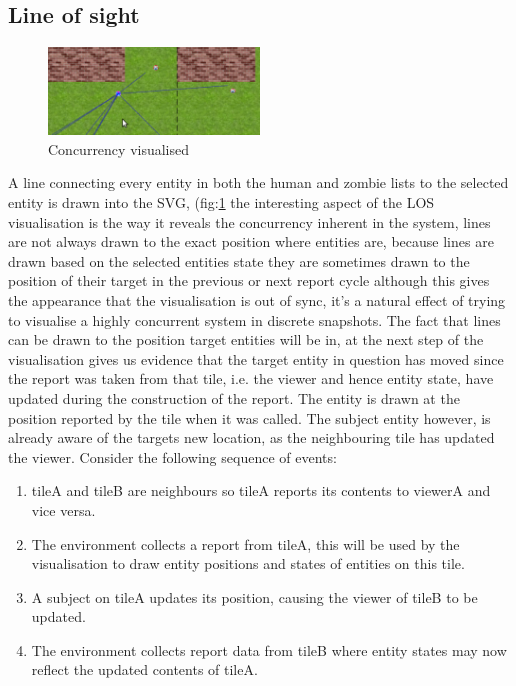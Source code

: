 \subsection{Line of sight}
\begin{figure}[h]
  \centering
  \includegraphics[width=0.5\textwidth]{img/concurrent-lag.png}
\caption{Concurrency visualised}
    \label{fig:Concurrency visualised}
\end{figure}
A line connecting every entity in both the human and zombie lists to the selected entity is drawn into the SVG, (fig:\ref{fig:Concurrency visualised} the interesting aspect of the LOS visualisation is the way it reveals the concurrency inherent in the system, lines are not always drawn to the exact position where entities are, because lines are drawn based on the selected entities state they are sometimes drawn to the position of their target in the previous or next report cycle although this gives the appearance that the visualisation is out of sync, it's a natural effect of trying to visualise a highly concurrent system in discrete snapshots. The fact that lines can be drawn to the position target entities will be in, at the next step of the visualisation gives us evidence that the target entity in question has moved since the report was taken from that tile, i.e. the viewer and hence entity state, have updated during the construction of the report. The entity is drawn at the position reported by the tile when it was called. The subject entity however, is already aware of the targets new location, as the neighbouring tile has updated the viewer.
Consider the following sequence of events:
\begin{enumerate}
\item{tileA and tileB are neighbours so tileA reports its contents to viewerA and vice versa.}
\item{The environment collects a report from tileA, this will be used by the visualisation to draw entity positions and states of entities on this tile.}
\item{A subject on tileA updates its position, causing the viewer of tileB to be updated.}
\item{The environment collects report data from tileB where entity states may now reflect the updated contents of tileA.}
\end{enumerate}
